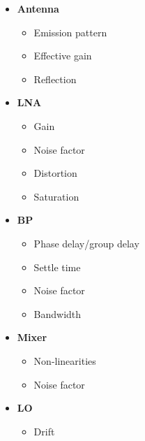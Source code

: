 \begin{minipage}{0.48\textwidth}
\begin{itemize}
\item \textbf{Antenna}
	\begin{itemize}
	\item Emission pattern
	\item Effective gain
	\item Reflection
	\end{itemize}
\end{itemize}
\end{minipage}
\begin{minipage}{0.48\textwidth}
\begin{itemize}
\item \textbf{\Gls{LNA}}
	\begin{itemize}
	\item Gain
	\item Noise factor
	\item Distortion
	\item Saturation
	\end{itemize}
\end{itemize}
\end{minipage}
\begin{minipage}{0.48\textwidth}
\begin{itemize}
\item \textbf{\Gls{BP}}
	\begin{itemize}
	\item Phase delay/group delay
	\item Settle time
	\item Noise factor
	\item Bandwidth
	\end{itemize}	
\end{itemize}
\end{minipage}
\begin{minipage}{0.48\textwidth}
\begin{itemize}
\item \textbf{Mixer}
	\begin{itemize}
	\item Non-linearities
	\item Noise factor	
	\end{itemize}
\end{itemize}
\end{minipage}
\begin{minipage}{0.48\textwidth}
\begin{itemize}
\item \textbf{\Gls{LO}}
	\begin{itemize}
	\item Drift
		\end{itemize}
\end{itemize}
\end{minipage}
